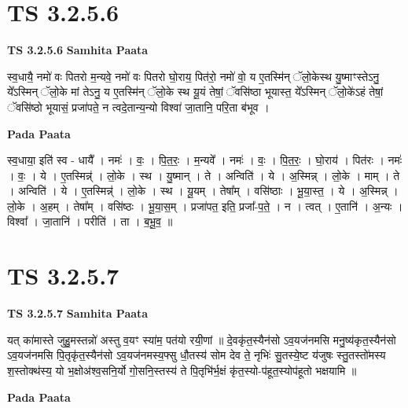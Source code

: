 \documentclass[17pt]{extarticle}
\begin{document}
\section{ TS 3.2.5.6 }

\textbf{TS 3.2.5.6 } \newline
\textbf{Samhita Paata} \newline

स्व॒धायै॒ नमो॑ वः पितरो म॒न्यवे॒ नमो॑ वः पितरो घो॒राय॒ पित॑रो॒ नमो॑ वो॒ य ए॒तस्मि॑न् ॅलो॒केस्थ यु॒ष्माꣳस्तेऽनु॒ ये᳚ऽस्मिन् ॅलो॒के मां तेऽनु॒ य ए॒तस्मि॑न् ॅलो॒के स्थ यू॒यं तेषां॒ ॅवसि॑ष्ठा भूयास्त॒ ये᳚ऽस्मिन् ॅलो॒के॑ऽहं तेषां॒ ॅवसि॑ष्ठो भूयासं॒ प्रजा॑पते॒ न त्वदे॒तान्य॒न्यो विश्वा॑ जा॒तानि॒ परि॒ता ब॑भूव । \newline

\textbf{Pada Paata} \newline

स्व॒धाया॒ इति॑ स्व - धायै᳚ । नमः॑ । वः॒ । पि॒त॒रः॒ । म॒न्यवे᳚ । नमः॑ । वः॒ । पि॒त॒रः॒ । घो॒राय॑ । पित॑रः । नमः॑ । वः॒ । ये । ए॒तस्मिन्न्॑ । लो॒के । स्थ । यु॒ष्मान् । ते । अन्विति॑ । ये । अ॒स्मिन्न् । लो॒के । माम् । ते । अन्विति॑ । ये । ए॒तस्मिन्न्॑ । लो॒के । स्थ । यू॒यम् । तेषा᳚म् । वसि॑ष्ठाः । भू॒या॒स्त॒ । ये । अ॒स्मिन्न् । लो॒के । अ॒हम् । तेषा᳚म् । वसि॑ष्ठः । भू॒या॒स॒म् । प्रजा॑पत॒ इति॒ प्रजा᳚-प॒ते॒ । न । त्वत् । ए॒तानि॑ । अ॒न्यः । विश्वा᳚ । जा॒तानि॑ । परीति॑ । ता । ब॒भू॒व॒ ॥  \newline





\section{ TS 3.2.5.7 }

\textbf{TS 3.2.5.7 } \newline
\textbf{Samhita Paata} \newline

यत् का॑मास्ते जुहु॒मस्तन्नो॑ अस्तु व॒यꣳ स्या॑म॒ पत॑यो रयी॒णां ॥ दे॒वकृ॑त॒स्यैन॑सो ऽव॒यज॑नमसि मनु॒ष्य॑कृत॒स्यैन॑सो ऽव॒यज॑नमसि पि॒तृकृ॑त॒स्यैन॑सो ऽव॒यज॑नमस्य॒फ्सु धौ॒तस्य॑ सोम देव ते॒ नृभिः॑ सु॒तस्ये॒ष्ट य॑जुषः स्तु॒तस्तो॑मस्य श॒स्तोक्थ॑स्य॒ यो भ॒क्षोअ॑श्व॒सनि॒र्यो गो॒सनि॒स्तस्य॑ ते पि॒तृभि॑र्भ॒क्षं कृ॑त॒स्यो-प॑हूत॒स्योप॑हूतो भक्षयामि ॥ \newline

\textbf{Pada Paata} \newline
\end{document}
